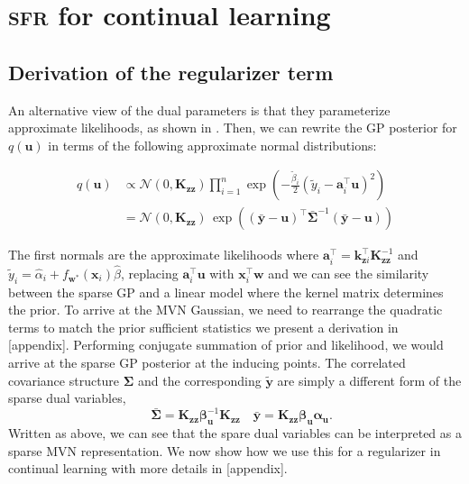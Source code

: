 \documentclass{article}
\newcommand{\our}{\textsc{sfr}\xspace}
\newcommand{\mathbold}[1]{\bm{#1}}
\newcommand{\mbf}[1]{\mathbf{#1}}
\newcommand{\valpha}[0]{\mathbold{\alpha}}
\newcommand{\vbeta}[0]{\mathbold{\beta}}
\newcommand{\vu}{\mbf{u}}
\newcommand{\vx}{\mbf{x}}
\newcommand{\vy}{\mbf{y}}
\newcommand{\vw}{\mbf{w}}
\newcommand{\va}{\mbf{a}}
\newcommand{\MKzz}{\mbf{K}_{\mbf{z}\mbf{z}}}
\newcommand{\vkzi}{\mbf{k}_{\mbf{z}i}}
\newcommand{\MSigma}[0]{\mathbold{\Sigma}}
\newcommand{\Norm}{\mathcal{N}}
\begin{document}
\section{\our for continual learning}
\label{app:cl}
\subsection{Derivation of the regularizer term}
An alternative view of the dual parameters is that they parameterize approximate likelihoods, as shown in \citep{khan2017conjugate, adam2021dual}. Then, we can rewrite the GP posterior for $q(\vu)$ in terms of the following approximate normal distributions:

\begin{equation}
\begin{aligned}
 q(\vu) 
 	&\propto \Norm(0, \MKzz) \prod_{i=1}^n \exp \! \left(-\frac{\tilde{\beta}_i}{2}(\tilde{y}_i - \va_i^\top \vu)^2 \right) \\
 	&= \Norm(0, \MKzz) \, \exp\left((\bar{\vy} - \vu)^\top \bar{\MSigma}^{-1}(\bar{\vy} - \vu)\right)  
\end{aligned}
\end{equation}

The first normals are the approximate likelihoods where $\va_i^\top = \vkzi^\top \MKzz^{-1}$ and $\tilde{y}_i = \hat{\alpha}_i + f_{\vw^*}(\vx_i)\hat{\beta}$,  replacing $\va_i^\top \vu$ with $\vx_i^{\top}\vw$ and we can see the similarity between the sparse GP and a linear model where the kernel matrix determines the prior. To arrive at the MVN Gaussian, we need to rearrange the quadratic terms to match the prior sufficient statistics we present a derivation in [appendix]. Performing conjugate summation of prior and likelihood, we would arrive at the sparse GP posterior at the inducing points. The correlated covariance structure $\MSigma$ and the corresponding $\tilde{\vy}$ are simply a different form of the sparse dual variables,
\begin{equation}
\quad \bar{\MSigma} =  \MKzz \vbeta_\vu^{-1} \MKzz \quad \bar{\vy} = \MKzz \vbeta_{\vu}\valpha_{\vu}.
\end{equation}
Written as above, we can see that the spare dual variables can be interpreted as a sparse MVN representation. We now show how we use this for a regularizer in continual learning with more details in [appendix].
\end{document}

